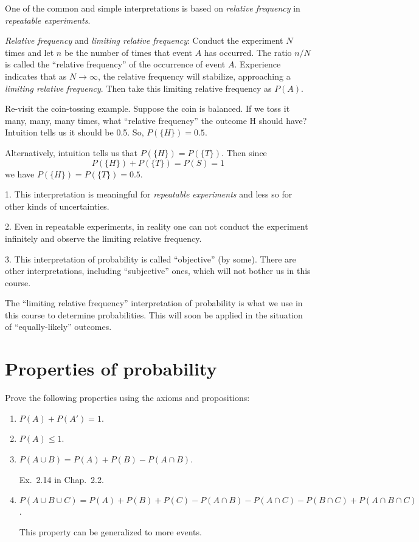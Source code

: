 \documentclass[12pt]{article}
\begin{document}
One of the common and simple interpretations is based on
\emph{relative frequency} in \emph{repeatable experiments}.

\emph{Relative frequency} and \emph{limiting relative frequency}:
Conduct the experiment $N$ times and let $n$ be the number
of times that event $A$ has occurred.
The ratio $n/N$ is called the ``relative frequency'' of the occurrence
of event $A$.
Experience indicates that as $N \to \infty$, the relative frequency
will stabilize, approaching a \emph{limiting relative frequency}.
Then take this limiting relative frequency as $P(A)$.

\example
Re-visit the coin-tossing example.
Suppose the coin is balanced.
If we toss it many, many, many times,
what ``relative frequency'' the outcome H should have?
Intuition tells us it should be 0.5.
So, $P(\{H\}) = 0.5$.

Alternatively, intuition tells us that
$P(\{H\}) = P(\{T\})$. Then since
\[
P(\{H\}) + P(\{T\}) = P(S) = 1
\]
we have $P(\{H\}) = P(\{T\}) = 0.5$.


\alert
1. This interpretation is meaningful for \emph{repeatable experiments}
and less so for other kinds of uncertainties.

2. Even in repeatable experiments, in reality one can not conduct the
experiment infinitely and observe the limiting relative frequency.

3. This interpretation of probability is called ``objective'' (by some).
There are other interpretations, including ``subjective'' ones,
which will not bother us in this course.

The ``limiting relative frequency'' interpretation of probability
is what we use in this course to determine probabilities.
This will soon be applied in the situation of
``equally-likely'' outcomes.

\section{Properties of probability}

Prove the following properties using the axioms and propositions:
\begin{enumerate}
\item $P(A) + P(A') = 1$.

\item $P(A) \le 1$.

\item $P(A \cup B) = P(A) + P(B) - P(A \cap B)$.

\example Ex.~2.14 in Chap.~2.2.

\item $P(A \cup B \cup C) = P(A) + P(B) + P(C)
    - P(A \cap B) - P(A \cap C) - P(B \cap C)
    + P(A \cap B \cap C)$.

This property can be generalized to more events.
\end{enumerate}
\end{document}
